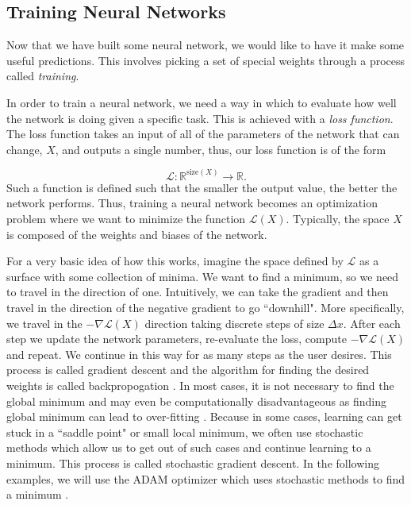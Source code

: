 \documentclass{CUP-JNL-DTM}%
\theoremstyle{definition}
\numberwithin{equation}{section}
\newcommand{\loss}{\mathcal{L}}
\newcommand{\Define}{\emph}
\begin{document}

\subsection{Training Neural Networks}

Now that we have built some neural network, we would like to have it make some useful predictions. This involves picking a set of special weights through a process called \Define{training}. 

In order to train a neural network, we need a way in which to evaluate how well the network is doing given a specific task. This is achieved with a \emph{loss function}. The loss function takes an input of all of the parameters of the network that can change, $X$, and outputs a single number, thus, our loss function is of the form

\begin{equation}
    \loss : \mathbb{R}^{\textrm{size}(X)} \rightarrow \mathbb{R}. 
\end{equation}
Such a function is defined such that the smaller the output value, the better the network performs. Thus, training a neural network becomes an optimization problem where we want to minimize the function $\loss(X)$. Typically, the space $X$ is composed of the weights and biases of the network. 

For a very basic idea of how this works, imagine the space defined by $\loss$ as a surface with some collection of minima. We want to find a minimum, so we need to travel in the direction of one. Intuitively, we can take the gradient and then travel in the direction of the negative gradient to go ``downhill". More specifically, we travel in the $-\nabla \loss(X)$ direction taking discrete steps of size $\Delta x$. After each step we update the network parameters, re-evaluate the loss, compute $-\nabla \loss(X)$ and repeat. We continue in this way for as many steps as the user desires. This process is called gradient descent and the algorithm for finding the desired weights is called backpropogation \cite{chauvinBackpropagationTheoryArchitectures1995}. In most cases, it is not necessary to find the global minimum and may even be computationally disadvantageous as finding global minimum can lead to over-fitting \cite{choromanskaLossSurfacesMultilayer2015}. Because in some cases, learning can get stuck in a ``saddle point" or small local minimum, we often use stochastic methods which allow us to get out of such cases and continue learning to a minimum. This process is called stochastic gradient descent. In the following examples, we will use the ADAM optimizer which uses stochastic methods to find a minimum \cite{kingmaAdamMethodStochastic2017}. 
\end{document}

